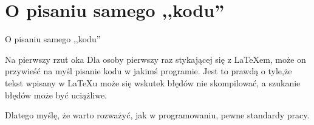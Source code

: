 \documentclass{beamer}
\begin{document}
\section{O pisaniu samego ,,kodu''}


\begin{frame}{O pisaniu samego ,,kodu''}
\pause

\begin{block}{Na pierwszy rzut oka}
Dla osoby pierwszy raz stykającej się z \LaTeX em, może on przywieść na myśl pisanie kodu w jakimś programie. Jest to
prawdą o tyle,\linebreak że tekst wpisany w \LaTeX u może się wskutek błędów nie skompilować, a szukanie błędów może być
uciążliwe. 
\end{block}
\pause

\begin{block}{}
Dlatego myślę, że warto rozważyć, jak w programowaniu, pewne standardy pracy.
\end{block}

\end{frame}
\end{document}
